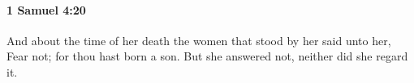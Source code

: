 
		\paragraph{1 Samuel 4:20} %
			\label{1SAMUEL-4-20}

			And about the time of her death the women that stood by her said unto her, Fear not; for thou hast born a son. But she answered not, neither did she regard it.


